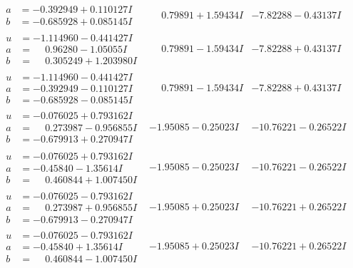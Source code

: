 \documentclass[1p]{elsarticle_modified}
\theoremstyle{definition}
\begin{document}
$$\begin{array}{c|c|c}
\begin{aligned}
a &= -0.392949 + 0.110127 I \\
b &= -0.685928 + 0.085145 I\end{aligned}
 & \phantom{-}0.79891 + 1.59434 I & -7.82288 - 0.43137 I \\ \hline\begin{aligned}
u &= -1.114960 - 0.441427 I \\
a &= \phantom{-}0.96280 - 1.05055 I \\
b &= \phantom{-}0.305249 + 1.203980 I\end{aligned}
 & \phantom{-}0.79891 - 1.59434 I & -7.82288 + 0.43137 I \\ \hline\begin{aligned}
u &= -1.114960 - 0.441427 I \\
a &= -0.392949 - 0.110127 I \\
b &= -0.685928 - 0.085145 I\end{aligned}
 & \phantom{-}0.79891 - 1.59434 I & -7.82288 + 0.43137 I \\ \hline\begin{aligned}
u &= -0.076025 + 0.793162 I \\
a &= \phantom{-}0.273987 - 0.956855 I \\
b &= -0.679913 + 0.270947 I\end{aligned}
 & -1.95085 - 0.25023 I & -10.76221 - 0.26522 I \\ \hline\begin{aligned}
u &= -0.076025 + 0.793162 I \\
a &= -0.45840 - 1.35614 I \\
b &= \phantom{-}0.460844 + 1.007450 I\end{aligned}
 & -1.95085 - 0.25023 I & -10.76221 - 0.26522 I \\ \hline\begin{aligned}
u &= -0.076025 - 0.793162 I \\
a &= \phantom{-}0.273987 + 0.956855 I \\
b &= -0.679913 - 0.270947 I\end{aligned}
 & -1.95085 + 0.25023 I & -10.76221 + 0.26522 I \\ \hline\begin{aligned}
u &= -0.076025 - 0.793162 I \\
a &= -0.45840 + 1.35614 I \\
b &= \phantom{-}0.460844 - 1.007450 I\end{aligned}
 & -1.95085 + 0.25023 I & -10.76221 + 0.26522 I \\ \hline\begin{aligned}

\end{aligned}
\end{array}$$
\end{document}
